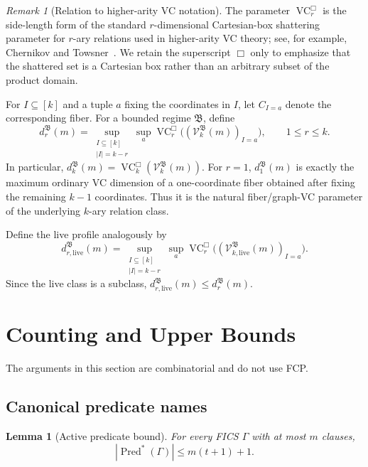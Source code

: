 \documentclass[11pt]{article}
\newtheorem{lemma}[theorem]{Lemma}
\theoremstyle{definition}
\theoremstyle{remark}
\newtheorem{remark}[theorem]{Remark}
\newcommand{\Pred}{\operatorname{Pred}}
\newcommand{\VCbox}{\operatorname{VC}^{\Box}}
\begin{document}
\begin{remark}[Relation to higher-arity VC notation]
The parameter \(\VCbox_r\) is the side-length form of the standard
\(r\)-dimensional Cartesian-box shattering parameter for \(r\)-ary relations
used in higher-arity VC theory; see, for example,
Chernikov and Towsner~\cite{ChernikovTowsner2020}.
We retain the superscript \(\Box\) only to emphasize that the shattered set is
a Cartesian box rather than an arbitrary subset of the product domain.
\end{remark}

For \(I\subseteq[k]\) and a tuple \(a\) fixing the coordinates in \(I\), let
\(C_{I=a}\) denote the corresponding fiber. For a bounded regime
\(\mathfrak B\), define
\[
d_r^{\mathfrak B}(m)
=
\sup_{\substack{I\subseteq[k]\\ |I|=k-r}}
\sup_a
\VCbox_r\bigl((\mathcal V_k^{\mathfrak B}(m))_{I=a}\bigr),
\qquad 1\le r\le k.
\]
In particular,
\(d_k^{\mathfrak B}(m) = \VCbox_k(\mathcal V_k^{\mathfrak B}(m)).\)
For \(r=1\), \(d_1^{\mathfrak B}(m)\) is exactly the maximum ordinary VC
dimension of a one-coordinate fiber obtained after fixing the remaining
\(k-1\) coordinates. Thus it is the natural fiber/graph-VC parameter of the
underlying \(k\)-ary relation class.

Define the live profile analogously by
\[
d_{r,\mathrm{live}}^{\mathfrak B}(m)
=
\sup_{\substack{I\subseteq[k]\\ |I|=k-r}}
\sup_a
\VCbox_r\bigl((\mathcal V_{k,\mathrm{live}}^{\mathfrak B}(m))_{I=a}\bigr).
\]
Since the live class is a subclass,
\(d_{r,\mathrm{live}}^{\mathfrak B}(m) \le d_r^{\mathfrak B}(m).\)

\section{Counting and Upper Bounds}
\label{sec:upper}

The arguments in this section are combinatorial and do not use FCP.

\subsection{Canonical predicate names}

\begin{lemma}[Active predicate bound]\label{lem:active-pred-bound}
For every FICS \(\Gamma\) with at most \(m\) clauses,
\[
|\Pred^\ast(\Gamma)|
\le
m(t+1)+1.
\]
\end{lemma}
\end{document}
